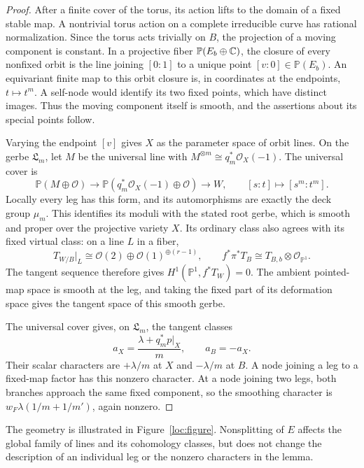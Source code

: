 \begin{proof}
After a finite cover of the torus, its action lifts to the domain of a
fixed stable map. A nontrivial torus action on a complete irreducible
curve has rational normalization. Since the torus acts trivially on
$B$, the projection of a moving component is constant. In a projective
fiber $\mathbb P(E_b\oplus\mathbb C)$, the closure of every nonfixed orbit is
the line joining $[0:1]$ to a unique point $[v:0]\in\mathbb P(E_b)$.
An equivariant finite map to this orbit closure is, in coordinates at
the endpoints, $t\mapsto t^m$. A self-node would identify its two
fixed points, which have distinct images. Thus the moving component
itself is smooth, and the assertions about its special points follow.

Varying the endpoint $[v]$ gives $X$ as the parameter space of orbit
lines. On the gerbe $\mathfrak L_m$, let $M$ be the universal line
with $M^{\otimes m}\cong q_m^*\mathcal O_X(-1)$. The universal cover is
\[
 \mathbb P(M\oplus\mathcal O)\longrightarrow
 \mathbb P(q_m^*\mathcal O_X(-1)\oplus\mathcal O)
 \longrightarrow W,\qquad [s:t]\longmapsto[s^m:t^m].
\]
Locally every leg has this form, and its automorphisms are exactly
the deck group $\mu_m$. This identifies its moduli with the stated
root gerbe, which is smooth and proper over the projective variety
$X$. Its ordinary class also agrees with its fixed virtual class:
on a line
$L$ in a fiber,
\[
 T_{W/B}|_L\cong\mathcal O(2)\oplus\mathcal O(1)^{\oplus(r-1)},
 \qquad f^*\pi^*T_B\cong T_{B,b}\otimes\mathcal O_{\mathbb P^1}.
\]
The tangent sequence therefore gives $H^1(\mathbb P^1,f^*T_W)=0$.
The ambient pointed-map space is smooth at the leg, and taking the
fixed part of its deformation space gives the tangent space of this
smooth gerbe.

The universal cover gives, on $\mathfrak L_m$, the tangent classes
\[
 a_X=\frac{\lambda+q_m^*p|_X}{m},\qquad a_B=-a_X.
\]
Their scalar characters are $+\lambda/m$ at $X$ and
$-\lambda/m$ at $B$. A node joining a leg to a fixed-map factor has
this nonzero character. At a node joining two legs, both branches
approach the same fixed component, so the smoothing character is
$w_F\lambda(1/m+1/m')$, again nonzero.
\end{proof}

The geometry is illustrated in Figure~\ref{loc:figure}. Nonsplitting of
$E$ affects the global family of lines and its cohomology classes, but
does not change the description of an individual leg or the nonzero
characters in the lemma.

